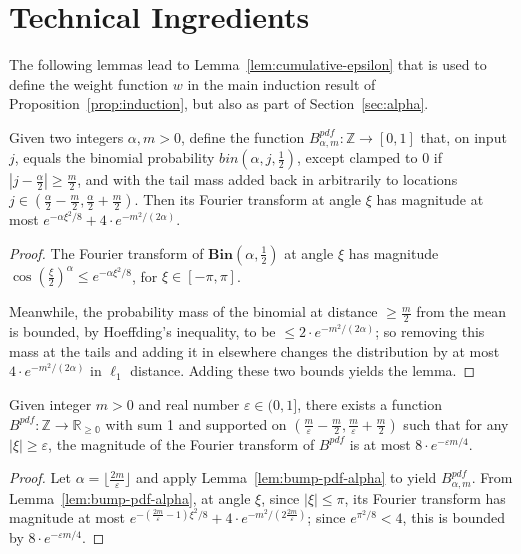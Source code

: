 \documentclass[11pt]{article}
\theoremstyle{plain}
\newcommand{\Bin}[2]{\textbf{Bin}(#1,#2)}
\newcommand{\eps}{\varepsilon}
\begin{document}
\section{Technical Ingredients}\label{sec:misc}
The following lemmas lead to Lemma~\ref{lem:cumulative-epsilon} that is used to define the weight function $w$ in the main induction result of Proposition~\ref{prop:induction}, but also as part of Section~\ref{sec:alpha}.

\begin{lemma}\label{lem:bump-pdf-alpha}
Given two integers $\alpha,m >0$, define the function $B^{pdf}_{\alpha,m }:\mathbb{Z}\rightarrow[0,1]$ that, on input $j$, equals the binomial probability $bin(\alpha,j,\frac{1}{2})$, except clamped to 0 if $|j-\frac{\alpha}{2}|\geq \frac{m}{2}$, and with the tail mass added back in arbitrarily to locations $j\in (\frac{\alpha}{2}-\frac{m}{2},\frac{\alpha}{2}+\frac{m}{2})$. Then its Fourier transform at angle $\xi$ has magnitude at most $e^{-\alpha\xi^2/8}+4\cdot e^{-m^2/(2\alpha)}$.
\end{lemma}
\begin{proof}
The Fourier transform of $\Bin{\alpha}{\frac{1}{2}}$ at angle $\xi$ has magnitude $\cos(\frac{\xi}{2})^{\alpha}\leq e^{-\alpha\xi^2/8}$, for $\xi\in[-\pi,\pi]$.

Meanwhile, the probability mass of the binomial at distance $\geq \frac{m}{2}$ from the mean is bounded, by Hoeffding's inequality, to be $\leq 2\cdot e^{-m^2/(2\alpha)}$; so removing this mass at the tails and adding it in elsewhere changes the distribution by at most $4\cdot e^{-m^2/(2\alpha)}$ in $\ell_1$ distance. Adding these two bounds yields the lemma.    
\end{proof}
\begin{lemma}\label{lem:bump-pdf-epsilon}
Given integer $m >0$ and real number $\eps\in(0,1]$, there exists a function $B^{pdf}:\mathbb{Z}\rightarrow\mathbb{R_{\geq 0}}$ with sum 1 and supported on $(\frac{m}{\eps} - \frac{m}{2}, \frac{m}{\eps} + \frac{m}{2})$ such that for any $|\xi|\geq \eps$, the magnitude of the Fourier transform of $B^{pdf}$ is at most $8\cdot e^{-\eps m/4}$. 
\end{lemma}
\begin{proof}
Let $\alpha=\lfloor\frac{2m}{\eps}\rfloor$ and apply Lemma~\ref{lem:bump-pdf-alpha} to yield $B^{pdf}_{\alpha,m}$. From Lemma~\ref{lem:bump-pdf-alpha}, at angle $\xi$, since $|\xi|\leq \pi$, its Fourier transform has magnitude at most $e^{-(\frac{2m}{\eps}-1)\xi^2/8}+4\cdot e^{-m^2/(2\frac{2m}{\eps})}$; since $e^{\pi^2/8}<4$, this is bounded by $8\cdot e^{-\eps m/4}$.
\end{proof}
\end{document}
